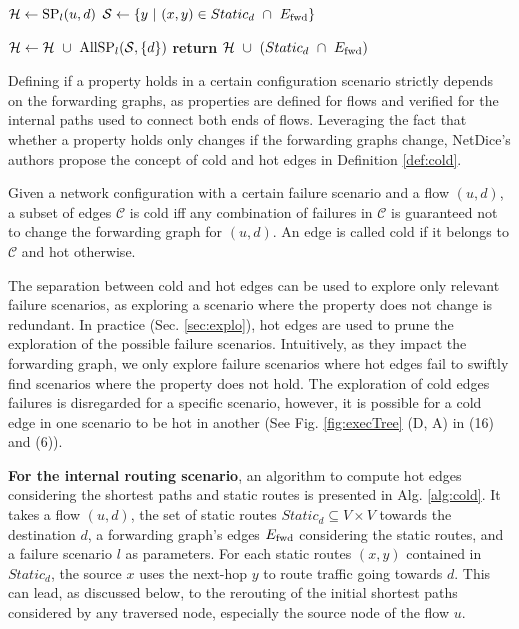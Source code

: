 \begin{algorithm}[t]
  \caption{Hot edges for static routes and shortest path}\label{alg:cold}
  \begin{algorithmic}[1]
		\State $\mathcal{H} \leftarrow \textnormal{SP}_l(u, d)$ 
    \State $\mathcal{S} \leftarrow \{ y ~ | ~ (x, y) \in Static_d ~ \cap ~ E_\textnormal{fwd} \}$ 

		\State $\mathcal{H} \leftarrow \mathcal{H} ~ \cup ~ \textnormal{AllSP}_l(\mathcal{S}, \{d\})$ 
    \State \textbf{return} $\mathcal{H} ~ \cup ~ (Static_d ~ \cap ~ E_\textnormal{fwd})$ 
    \EndProcedure
  \end{algorithmic}
\end{algorithm}

Defining if a property holds in a certain configuration scenario strictly depends on the forwarding graphs, as properties are defined for flows and verified for the internal paths used to connect both ends of flows. 
Leveraging the fact that whether a property holds only changes if the forwarding graphs change, NetDice's authors propose the concept of cold and hot edges in Definition \ref{def:cold}.

\begin{definition}\label{def:cold}
  Given a network configuration with a certain failure scenario and a flow $(u, d)$, a subset of edges $\mathcal{C}$ is cold iff any combination of failures in $\mathcal{C}$ is guaranteed not to change the forwarding graph for $(u, d)$. An edge is called cold if it belongs to $\mathcal{C}$ and hot otherwise.
\end{definition}

The separation between cold and hot edges can be used to explore only relevant failure scenarios, as exploring a scenario where the property does not change is redundant.
In practice (Sec. \ref{sec:explo}), hot edges are used to prune the exploration of the possible failure scenarios.
Intuitively, as they impact the forwarding graph, we only explore failure scenarios where hot edges fail to swiftly find scenarios where the property does not hold.
The exploration of cold edges failures is disregarded for a specific scenario, however, it is possible for a cold edge in one scenario to be hot in another (See Fig. \ref{fig:execTree} (D, A) in (16) and (6)).  


\textbf{For the internal routing scenario}, an algorithm to compute hot edges considering the shortest paths and  static routes is presented in Alg. \ref{alg:cold}.
It takes a flow $(u,d)$,  the set of static routes $Static_d \subseteq V\times V$ towards the destination $d$, a forwarding graph's edges $E_\textnormal{fwd}$ considering the static routes, and a failure scenario $l$ as parameters. 
For each static routes $(x, y)$ contained in $Static_d$, the source $x$ uses the next-hop $y$ to route traffic going towards $d$.      
This can lead, as discussed below, to the rerouting of the initial shortest paths considered by any traversed node, especially the source node of the flow $u$.

